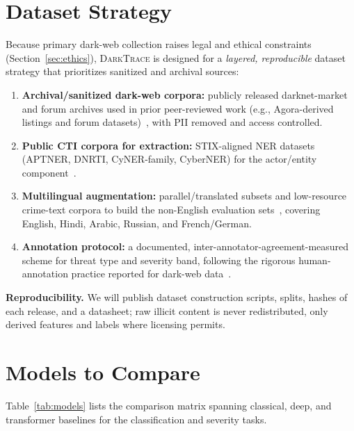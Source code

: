 \documentclass[11pt,a4paper]{article}
\newcommand{\framework}{\textsc{DarkTrace}}
\begin{document}
\section{Dataset Strategy}\label{sec:data}

Because primary dark-web collection raises legal and ethical constraints
(Section~\ref{sec:ethics}), \framework{} is designed for a \emph{layered, reproducible}
dataset strategy that prioritizes sanitized and archival sources:

\begin{enumerate}[leftmargin=1.5em]
  \item \textbf{Archival/sanitized dark-web corpora:} publicly released darknet-market
  and forum archives used in prior peer-reviewed work (e.g., Agora-derived listings and
  forum datasets)~\cite{sangher2023towards}, with PII removed and access controlled.
  \item \textbf{Public CTI corpora for extraction:} STIX-aligned NER datasets
  (APTNER, DNRTI, CyNER-family, CyberNER) for the actor/entity
  component~\cite{wang2022aptner,evangelatos2021ner,echchammakhy2025cyberner,feng2025promptbart}.
  \item \textbf{Multilingual augmentation:} parallel/translated subsets and
  low-resource crime-text corpora to build the non-English evaluation
  sets~\cite{alharbi2025bert,nazir2025multilingual}, covering English, Hindi, Arabic,
  Russian, and French/German.
  \item \textbf{Annotation protocol:} a documented, inter-annotator-agreement-measured
  scheme for threat type and severity band, following the rigorous human-annotation
  practice reported for dark-web data~\cite{sangher2023towards}.
\end{enumerate}

\noindent\textbf{Reproducibility.} We will publish dataset construction scripts, splits,
hashes of each release, and a datasheet; raw illicit content is never redistributed,
only derived features and labels where licensing permits.

\section{Models to Compare}\label{sec:models}

Table~\ref{tab:models} lists the comparison matrix spanning classical, deep, and
transformer baselines for the classification and severity tasks.
\end{document}
